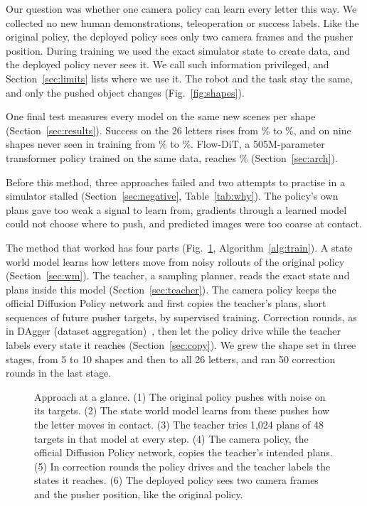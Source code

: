 \documentclass[10pt,twocolumn,letterpaper]{article}
\begin{document}
Our question was whether one camera policy can learn every letter this way. We collected no new human
demonstrations, teleoperation or success labels. Like the original policy, the deployed policy sees only two camera
frames and the pusher position. During training we used the exact simulator state to create data, and the deployed
policy never sees it. We call such information privileged, and Section~\ref{sec:limits} lists where we use it. The
robot and the task stay the same, and only the pushed object changes (Fig.~\ref{fig:shapes}).

One final test measures every model on the same \numTestScenes{} new scenes per shape (Section~\ref{sec:results}).
Success on the 26 letters rises from \numHeadOrig\% to \numHeadMain\%, and on nine shapes never seen in training from
\numUnseenOrig\% to \numUnseenMain\%. Flow-DiT, a 505M-parameter transformer policy trained on the same data, reaches
\numHeadFlow\% (Section~\ref{sec:arch}).

Before this method, three approaches failed and two attempts to practise in a simulator stalled
(Section~\ref{sec:negative}, Table~\ref{tab:why}). The policy's own plans gave too weak a signal to learn from,
gradients through a learned model could not choose where to push, and predicted images were too coarse at contact.

The method that worked has four parts (Fig.~\ref{fig:method}, Algorithm~\ref{alg:train}). A state world model learns
how letters move from noisy rollouts of the original policy (Section~\ref{sec:wm}). The teacher, a sampling planner,
reads the exact state and plans inside this model (Section~\ref{sec:teacher}). The camera policy keeps the official
Diffusion Policy network and first copies the teacher's plans, short sequences of future pusher targets, by supervised
training. Correction rounds, as in DAgger (dataset aggregation)~\citep{ross2011dagger}, then let the policy drive while
the teacher labels every state it reaches (Section~\ref{sec:copy}). We grew the shape set in three stages, from 5 to 10
shapes and then to all 26 letters, and ran 50 correction rounds in the last stage.

\begin{figure}[t]
  \centering
  
  \caption{Approach at a glance. (1) The original policy pushes with noise on its targets. (2) The state world model
  learns from these pushes how the letter moves in contact. (3) The teacher tries 1,024 plans of 48 targets in that
  model at every step. (4) The camera policy, the official Diffusion Policy network, copies the teacher's intended
  plans. (5) In correction rounds the policy drives and the teacher labels the states it reaches. (6) The deployed
  policy sees two camera frames and the pusher position, like the original policy.}
  \label{fig:method}
\end{figure}
\end{document}
